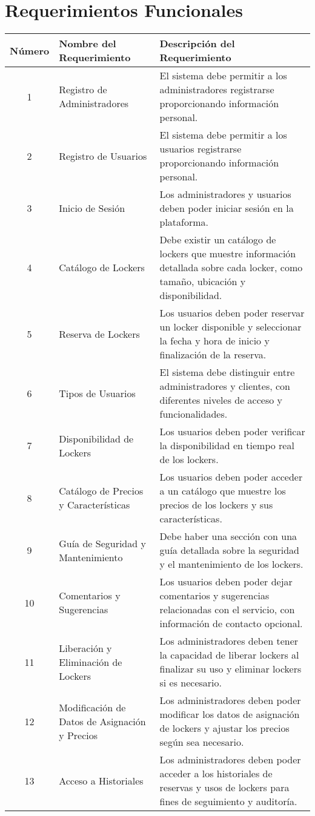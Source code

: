 \documentclass[12pt,a4paper]{article}
\begin{document}
\section{Requerimientos Funcionales}
\begin{center}
\begin{tabular}{|c|l|p{6cm}|}
    \hline
    \textbf{Número} & \textbf{Nombre del Requerimiento} & \textbf{Descripción del Requerimiento} \\
    \hline
    1 & Registro de Administradores & El sistema debe permitir a los administradores registrarse proporcionando información personal. \\
    \hline
    2 & Registro de Usuarios & El sistema debe permitir a los usuarios registrarse proporcionando información personal. \\
    \hline
    3 & Inicio de Sesión & Los administradores y usuarios deben poder iniciar sesión en la plataforma. \\
    \hline
    4 & Catálogo de Lockers & Debe existir un catálogo de lockers que muestre información detallada sobre cada locker, como tamaño, ubicación y disponibilidad. \\
    \hline
    5 & Reserva de Lockers & Los usuarios deben poder reservar un locker disponible y seleccionar la fecha y hora de inicio y finalización de la reserva. \\
    \hline
    6 & Tipos de Usuarios & El sistema debe distinguir entre administradores y clientes, con diferentes niveles de acceso y funcionalidades. \\
    \hline
    7 & Disponibilidad de Lockers & Los usuarios deben poder verificar la disponibilidad en tiempo real de los lockers. \\
    \hline
    8 & Catálogo de Precios y Características & Los usuarios deben poder acceder a un catálogo que muestre los precios de los lockers y sus características. \\
    \hline
    9 & Guía de Seguridad y Mantenimiento & Debe haber una sección con una guía detallada sobre la seguridad y el mantenimiento de los lockers. \\
    \hline
    10 & Comentarios y Sugerencias & Los usuarios deben poder dejar comentarios y sugerencias relacionadas con el servicio, con información de contacto opcional. \\
    \hline
    11 & Liberación y Eliminación de Lockers & Los administradores deben tener la capacidad de liberar lockers al finalizar su uso y eliminar lockers si es necesario. \\
    \hline
    12 & Modificación de Datos de Asignación y Precios & Los administradores deben poder modificar los datos de asignación de lockers y ajustar los precios según sea necesario. \\
    \hline
    13 & Acceso a Historiales & Los administradores deben poder acceder a los historiales de reservas y usos de lockers para fines de seguimiento y auditoría. \\
    \hline
\end{tabular}
\end{center}
\end{document}
